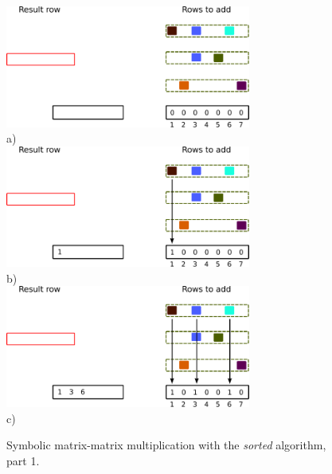 \begin{figure}[H]
\centering
\includegraphics[width=0.72\textwidth]{sorted/spgemm-sorted-3}\\
a)\\
\vspace*{5mm}
\includegraphics[width=0.72\textwidth]{sorted/spgemm-sorted-4}\\
b)\\
\vspace*{5mm}
\includegraphics[width=0.72\textwidth]{sorted/spgemm-sorted-6}\\
c)\\
\vspace*{5mm}
\caption{Symbolic matrix-matrix multiplication with the \textit{sorted} algorithm, part 1.}
\label{fig:spgemm-sorted_1}
\end{figure}

